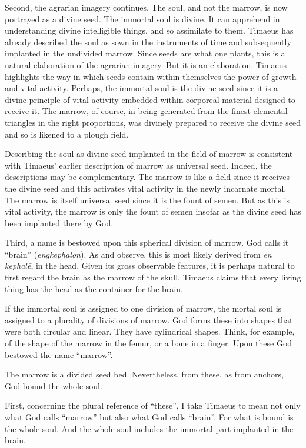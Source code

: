 Second, the agrarian imagery continues. The soul, and not the marrow, is now portrayed as a divine seed. The immortal soul is divine. It can apprehend in understanding divine intelligible things, and so assimilate to them. Timaeus has already described the soul as sown in the instruments of time and subsequently implanted in the undivided marrow. Since seeds are what one plants, this is a natural elaboration of the agrarian imagery. But it is an elaboration. Timaeus highlights the way in which seeds contain within themselves the power of growth and vital activity. Perhaps, the immortal soul is the divine seed since it is a divine principle of vital activity embedded within corporeal material designed to receive it. The marrow, of course, in being generated from the finest elemental triangles in the right proportions, was divinely prepared to receive the divine seed and so is likened to a plough field.

Describing the soul as divine seed implanted in the field of marrow is consistent with Timaeus' earlier description of marrow as universal seed. Indeed, the descriptions may be complementary. The marrow is like a field since it receives the divine seed and this activates vital activity in the newly incarnate mortal. The marrow is itself universal seed since it is the fount of semen. But as this is vital activity, the marrow is only the fount of semen insofar as the divine seed has been implanted there by God.

Third, a name is bestowed upon this spherical division of marrow. God calls it ``brain''  (\emph{engkephalon}). As \citet[77 n2]{Taylor:1929ov} and \citet[293 n3]{Cornford:1935fk} observe, this is most likely derived from \emph{en kephalē}, in the head. Given its gross observable features, it is perhaps natural to first regard the brain as the marrow of the skull. Timaeus claims that every living thing has the head as the container for the brain.

If the immortal soul is assigned to one division of marrow, the mortal soul is assigned to a plurality of divisions of marrow. God forms these into shapes that were both circular and linear. They have cylindrical shapes. Think, for example, of the shape of the marrow in the femur, or a bone in a finger. Upon these God bestowed the name ``marrow''.

The marrow is a divided seed bed. Nevertheless, from these, as from anchors, God bound the whole soul.

First, concerning the plural reference of ``these'', I take Timaeus to mean not only what God calls ``marrow'' but also what God calls ``brain''. For what is bound is the whole soul. And the whole soul includes the immortal part implanted in the brain.

